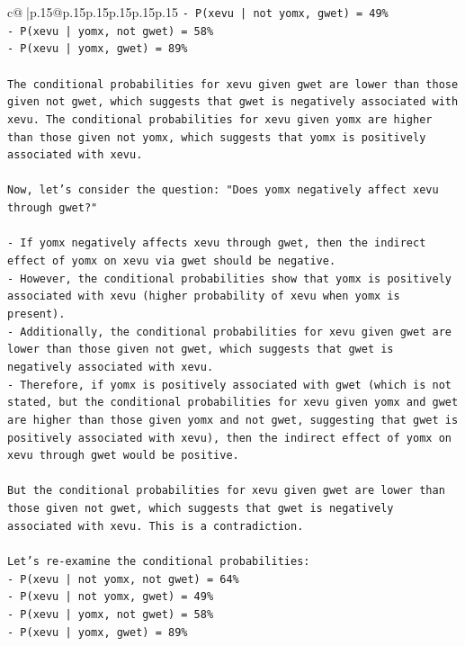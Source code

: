 \documentclass{article}
\begin{document}
{\begin{supertabular}{c@{$\;$}|p{.15\linewidth}@{}p{.15\linewidth}p{.15\linewidth}p{.15\linewidth}p{.15\linewidth}p{.15\linewidth}}
{{{\texttt{{-}   P(xevu | not yomx, gwet) = 49\%} \\
\texttt{{-}   P(xevu | yomx, not gwet) = 58\%} \\
\texttt{{-}   P(xevu | yomx, gwet) = 89\%} \\
\\ 
\texttt{The conditional probabilities for xevu given gwet are lower than those given not gwet, which suggests that gwet is negatively associated with xevu. The conditional probabilities for xevu given yomx are higher than those given not yomx, which suggests that yomx is positively associated with xevu.} \\
\\ 
\texttt{Now, let's consider the question: "Does yomx negatively affect xevu through gwet?"} \\
\\ 
\texttt{{-}   If yomx negatively affects xevu through gwet, then the indirect effect of yomx on xevu via gwet should be negative.} \\
\texttt{{-}   However, the conditional probabilities show that yomx is positively associated with xevu (higher probability of xevu when yomx is present).} \\
\texttt{{-}   Additionally, the conditional probabilities for xevu given gwet are lower than those given not gwet, which suggests that gwet is negatively associated with xevu.} \\
\texttt{{-}   Therefore, if yomx is positively associated with gwet (which is not stated, but the conditional probabilities for xevu given yomx and gwet are higher than those given yomx and not gwet, suggesting that gwet is positively associated with xevu), then the indirect effect of yomx on xevu through gwet would be positive.} \\
\\ 
\texttt{But the conditional probabilities for xevu given gwet are lower than those given not gwet, which suggests that gwet is negatively associated with xevu. This is a contradiction.} \\
\\ 
\texttt{Let's re{-}examine the conditional probabilities:} \\
\texttt{{-}   P(xevu | not yomx, not gwet) = 64\%} \\
\texttt{{-}   P(xevu | not yomx, gwet) = 49\%} \\
\texttt{{-}   P(xevu | yomx, not gwet) = 58\%} \\
\texttt{{-}   P(xevu | yomx, gwet) = 89\%} \\
}}}
\end{supertabular}}
\end{document}
